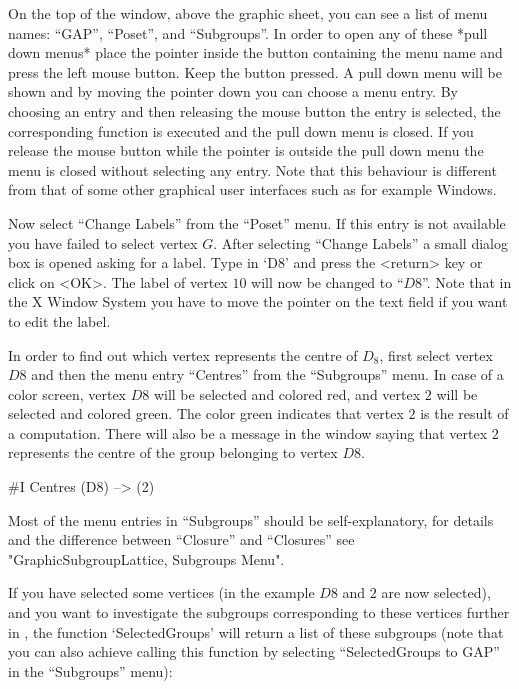 On the top of the window, above the graphic sheet, you  can see a list
of  menu names:  ``GAP'',  ``Poset'', and ``Subgroups''.   In order to
open  any of  these *pull down  menus*  place  the pointer inside  the
button containing the menu name and press the left mouse button.  Keep
the button pressed.  A pull down menu will  be shown and by moving the
pointer down  you can choose  a menu entry.   By choosing an entry and
then  releasing    the mouse   button the   entry    is  selected, the
corresponding function is  executed and the  pull down menu is closed. 
If you release the mouse button while the  pointer is outside the pull
down  menu the menu  is closed without selecting  any entry. Note that
this   behaviour is different from that   of some other graphical user
interfaces such as for example Windows.

Now  select ``Change Labels'' from the  ``Poset'' menu.  If this entry
is not   available  you have  failed to    select vertex  $G$.   After
selecting ``Change Labels'' a small dialog box is  opened asking for a
label.  Type in `D8' and press the <return> key or click on <OK>.  The
label of vertex $10$ will now be changed to ``$D8$''. Note that in the
X Window System you have to move the pointer on  the text field if you
want to edit the label.

In  order to find   out which vertex  represents the  centre of $D_8$,
first select vertex $D8$ and then the menu  entry ``Centres'' from the
``Subgroups'' menu.  In  case of a color  screen, vertex  $D8$ will be
selected and colored red, and vertex  $2$ will be selected and colored
green.  The color  green indicates that vertex $2$  is the result of a
computation.  There will also be a message in the {\GAP} window saying
that vertex $2$ represents the centre of the group belonging to vertex
$D8$.

\begintt
#I  Centres (D8) --> (2)
\endtt

Most of  the menu entries  in ``Subgroups'' should be self-explanatory, for
details and  the   difference   between  ``Closure''  and    ``Closures'' see
"GraphicSubgroupLattice, Subgroups Menu".

If you have selected some vertices (in the example $D8$ and $2$ are now
selected), and you want to investigate the subgroups corresponding to these
vertices further in {\GAP}, the function `SelectedGroups' will return a
list of these subgroups (note that you can also achieve calling this
function by selecting ``SelectedGroups to GAP'' in the ``Subgroups'' menu):

